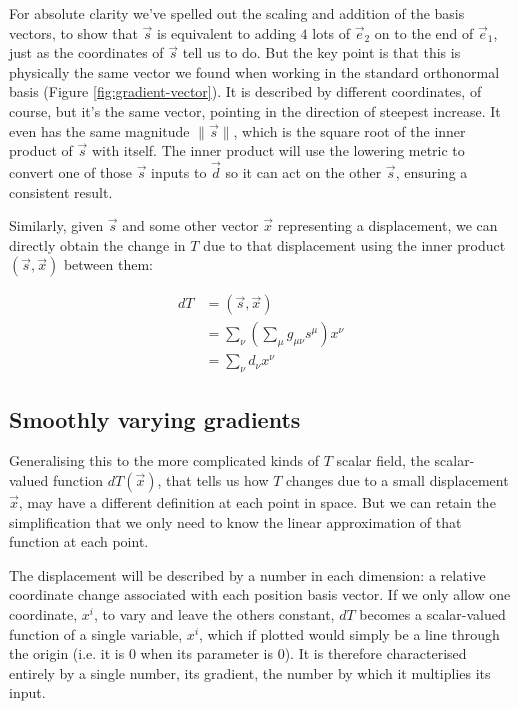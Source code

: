 For absolute clarity we've spelled out the scaling and addition of the basis vectors, to show that $\vec{s}$ is equivalent to adding $4$ lots of $\vec{e}_2$ on to the end of $\vec{e}_1$, just as the coordinates of $\vec{s}$ tell us to do. But the key point is that this is physically the same vector we found when working in the standard orthonormal basis (Figure \ref{fig:gradient-vector}). It is described by different coordinates, of course, but it's the same vector, pointing in the direction of steepest increase. It even has the same magnitude $\|\vec{s}\|$, which is the square root of the inner product of $\vec{s}$ with itself. The inner product will use the lowering metric to convert one of those $\vec{s}$ inputs to $\vec{d}$ so it can act on the other $\vec{s}$, ensuring a consistent result.

Similarly, given $\vec{s}$ and some other vector $\vec{x}$ representing a displacement, we can directly obtain the change in $T$ due to that displacement using the inner product $(\vec{s}, \vec{x})$ between them:

\begin{equation}
\begin{split}
dT &= (\vec{s}, \vec{x}) \\
   &= \sum_{\nu} \left( \sum_{\mu} g_{\mu\nu} s^{\mu} \right) x^{\nu} \\
    &= \sum_{\nu} d_{\nu} x^{\nu}
\end{split}
\end{equation}

\subsection{Smoothly varying gradients}

Generalising this to the more complicated kinds of $T$ scalar field, the scalar-valued function $dT(\vec{x})$, that tells us how $T$ changes due to a small displacement $\vec{x}$, may have a different definition at each point in space. But we can retain the simplification that we only need to know the linear approximation of that function at each point.

The displacement will be described by a number in each dimension: a relative coordinate change associated with each position basis vector. If we only allow one coordinate, $x^i$, to vary and leave the others constant, $dT$ becomes a scalar-valued function of a single variable, $x^i$, which if plotted would simply be a line through the origin (i.e. it is $0$ when its parameter is $0$). It is therefore characterised entirely by a single number, its gradient, the number by which it multiplies its input.

